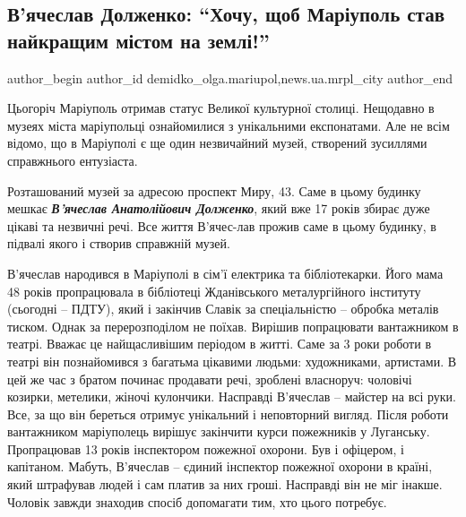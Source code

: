  
 
 
 
 
 
\subsection{В'ячеслав Долженко: \enquote{Хочу, щоб Маріуполь став найкращим містом на землі!}}
\label{sec:26_05_2021.stz.news.ua.mrpl_city.1.vjacheslav_dolzhenko}
 
\ifcmt
 author_begin
   author_id demidko_olga.mariupol,news.ua.mrpl_city
 author_end
\fi

Цьогоріч Маріуполь отримав статус Великої культурної столиці. Нещодавно в
музеях міста маріупольці ознайомилися з унікальними  експонатами. Але не всім
відомо, що в Маріуполі є ще один незвичайний музей, створений зусиллями
справжнього ентузіаста.


Розташований музей за адресою проспект Миру, 43. Саме в цьому будинку мешкає
\textbf{\emph{В'ячеслав Анатолійович Долженко}}, який вже 17 років збирає дуже цікаві та
незвичні речі. Все життя В'ячес\hyp{}лав прожив саме в цьому будинку, в підвалі якого
і створив справжній музей.


В'ячеслав народився в Маріуполі в сім'ї електрика та бібліотекарки. Його мама
48 років пропрацювала в бібліотеці Жданівського металургійного інституту
(сьогодні – ПДТУ), який і закінчив Славік за спеціальністю – обробка металів
тиском. Однак за перерозподілом не поїхав. Вирішив попрацювати вантажником в
театрі. Вважає це найщасливішим періодом в житті. Саме за 3 роки роботи в
театрі він познайомився з багатьма цікавими людьми: художниками, артистами. В
цей же час з братом починає продавати речі, зроблені власноруч: чоловічі
козирки, метелики, жіночі кулончики. Насправді В'ячеслав – майстер на всі руки.
Все, за що він береться отримує унікальний і неповторний вигляд. Після роботи
вантажником маріуполець вирішує закінчити курси пожежників у Луганську.
Пропрацював 13 років інспектором пожежної охорони. Був і офіцером, і капітаном.
Мабуть, В'ячеслав – єдиний інспектор пожежної охорони в країні, який штрафував
людей і сам платив за них гроші. Насправді він не міг інакше. Чоловік завжди
знаходив спосіб допомагати тим, хто цього потребує.

